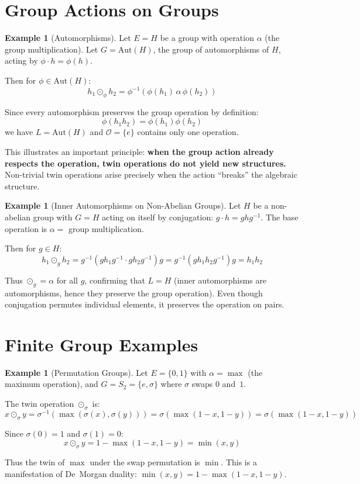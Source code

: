 \documentclass[11pt,a4paper,openany]{book}
\theoremstyle{plain}
\theoremstyle{definition}
\newtheorem{example}[theorem]{Example}
\newcommand{\twing}[1]{\odot_{#1}}
\newcommand{\opspace}{\mathcal{O}}
\newcommand{\lingroup}{L}
\newcommand{\actspace}{E}
\newcommand{\groupG}{G}
\newcommand{\Aut}{\mathrm{Aut}}
\begin{document}
\section{Group Actions on Groups}\label{sec:ex-groups}

\begin{example}[Automorphisms]\label{ex:group-conjugation}
Let $\actspace = H$ be a group with operation $\alpha$ (the group multiplication). Let $\groupG = \Aut(H)$, the group of automorphisms of $H$, acting by $\phi \cdot h = \phi(h)$.

Then for $\phi \in \Aut(H)$:
\[
h_1 \twing{\phi} h_2 = \phi^{-1}(\phi(h_1) \,\alpha\, \phi(h_2))
\]

Since every automorphism preserves the group operation by definition:
\[
\phi(h_1 h_2) = \phi(h_1)\phi(h_2)
\]
we have $\lingroup = \Aut(H)$ and $\opspace = \{e\}$ contains only one operation.

This illustrates an important principle: \textbf{when the group action already respects the operation, twin operations do not yield new structures.} Non-trivial twin operations arise precisely when the action ``breaks'' the algebraic structure.
\end{example}

\begin{example}[Inner Automorphisms on Non-Abelian Groups]\label{ex:inner-auto}
Let $H$ be a non-abelian group with $\groupG = H$ acting on itself by conjugation: $g \cdot h = ghg^{-1}$. The base operation is $\alpha = $ group multiplication.

Then for $g \in H$:
\[
h_1 \twing{g} h_2 = g^{-1}(gh_1g^{-1} \cdot gh_2g^{-1})g = g^{-1}(gh_1h_2g^{-1})g = h_1 h_2
\]

Thus $\twing{g} = \alpha$ for all $g$, confirming that $\lingroup = H$ (inner automorphisms are automorphisms, hence they preserve the group operation). Even though conjugation permutes individual elements, it preserves the operation on pairs.
\end{example}

\section{Finite Group Examples}\label{sec:ex-finite}

\begin{example}[Permutation Groups]\label{ex:permutations}
Let $\actspace = \{0, 1\}$ with $\alpha = \max$ (the maximum operation), and $\groupG = S_2 = \{e, \sigma\}$ where $\sigma$ swaps $0$ and~$1$.

The twin operation $\twing{\sigma}$ is:
\[
x \twing{\sigma} y = \sigma^{-1}(\max(\sigma(x), \sigma(y))) = \sigma(\max(1-x, 1-y)) = \sigma(\max(1-x, 1-y))
\]

Since $\sigma(0) = 1$ and $\sigma(1) = 0$:
\[
x \twing{\sigma} y = 1 - \max(1-x, 1-y) = \min(x, y)
\]

Thus the twin of $\max$ under the swap permutation is $\min$. This is a manifestation of De~Morgan duality: $\min(x,y) = 1 - \max(1-x, 1-y)$.
\end{example}
\end{document}
